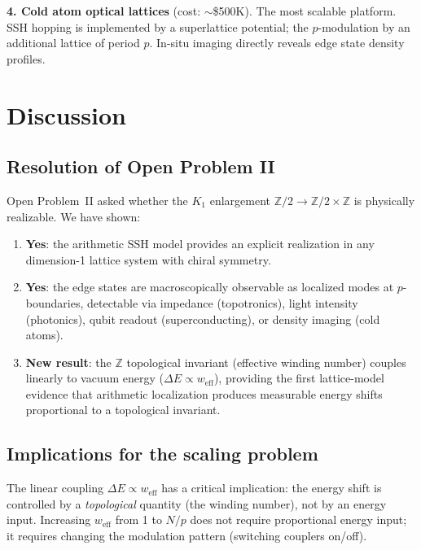 \documentclass[11pt,a4paper]{article}
\begin{document}
\textbf{4. Cold atom optical lattices} (cost: $\sim$\$500K).
The most scalable platform. SSH hopping is implemented by
a superlattice potential; the $p$-modulation by an additional
lattice of period $p$. In-situ imaging directly reveals
edge state density profiles.

\section{Discussion}
\label{sec:discussion}

\subsection{Resolution of Open Problem II}

Open Problem~II asked whether the $K_1$ enlargement
$\mathbb{Z}/2 \to \mathbb{Z}/2 \times \mathbb{Z}$ is physically
realizable. We have shown:

\begin{enumerate}
\item \textbf{Yes}: the arithmetic SSH model provides an explicit
  realization in any dimension-1 lattice system with chiral symmetry.
\item \textbf{Yes}: the edge states are macroscopically observable
  as localized modes at $p$-boundaries, detectable via impedance
  (topotronics), light intensity (photonics), qubit readout
  (superconducting), or density imaging (cold atoms).
\item \textbf{New result}: the $\mathbb{Z}$ topological invariant
  (effective winding number) couples linearly to vacuum energy
  ($\Delta E \propto w_{\mathrm{eff}}$), providing the first
  lattice-model evidence that arithmetic localization produces
  measurable energy shifts proportional to a topological invariant.
\end{enumerate}

\subsection{Implications for the scaling problem}

The linear coupling $\Delta E \propto w_{\mathrm{eff}}$ has a
critical implication: the energy shift is controlled by a
\emph{topological} quantity (the winding number), not by
an energy input. Increasing $w_{\mathrm{eff}}$ from 1 to $N/p$
does not require proportional energy input; it requires
changing the modulation pattern (switching couplers on/off).
\end{document}
